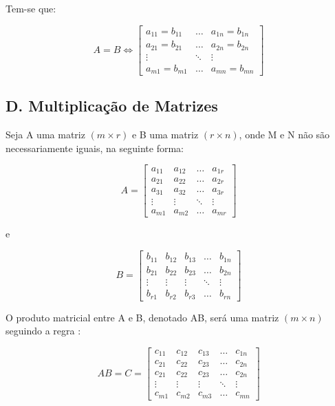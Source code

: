 \documentclass[twocolumn, 10pt]{extarticle}
\begin{document}
Tem-se que:

\[ 
A = B \iff
\begin{bmatrix}
a_{11} = b_{11}  & \dots & a_{1n} = b_{1n} \\
a_{21} = b_{21}  & \dots & a_{2n} = b_{2n} \\
\vdots & \ddots  & \vdots \\
a_{m1} = b_{m1}  & \dots & a_{mn} = b_{mn} 

\end{bmatrix}
\]

\subsection*{D. \quad Multiplicação de Matrizes}

Seja A uma matriz $(m \times r)$ e B uma matriz $(r \times n)$, onde M e N não são necessariamente iguais, na seguinte forma:

\[ 
A = 
\begin{bmatrix}
a_{11} & a_{12} & \dots & a_{1r} \\
a_{21} & a_{22} & \dots & a_{2r} \\
a_{31} & a_{32} & \dots & a_{3r} \\
\vdots & \vdots & \ddots & \vdots \\
a_{m1} & a_{m2} & \dots & a_{mr} 

\end{bmatrix}
\]

e

\[ 
B = 
\begin{bmatrix}
b_{11} & b_{12} & b_{13} & \dots & b_{1n} \\
b_{21} & b_{22} & b_{23} & \dots & b_{2n} \\
\vdots & \vdots & \vdots & \ddots & \vdots \\
b_{r1} & b_{r2} & b_{r3} & \dots & b_{rn} 

\end{bmatrix}
\]

O produto matricial entre A e B, denotado AB, será uma matriz $(m \times n)$ seguindo a regra \cite[p. 30]{antonAlgebra}: 

\[ 
AB = C =
\begin{bmatrix}
c_{11} & c_{12} & c_{13} & \dots & c_{1n} \\
c_{21} & c_{22} & c_{23} & \dots & c_{2n} \\
c_{21} & c_{22} & c_{23} & \dots & c_{2n} \\
\vdots & \vdots & \vdots & \ddots & \vdots \\
c_{m1} & c_{m2} & c_{m3} & \dots & c_{mn} 

\end{bmatrix}
\]
\end{document}
